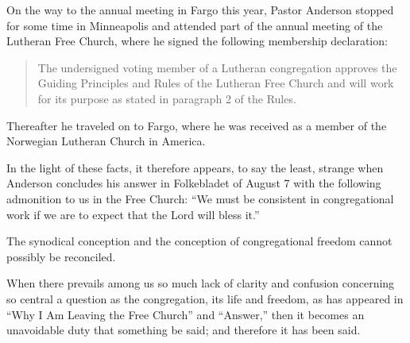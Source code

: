 On the way to the annual meeting in Fargo this year, Pastor Anderson stopped for some time in Minneapolis and attended part of the annual meeting of the Lutheran Free Church, where he signed the following membership declaration:

\begin{quote}
The undersigned voting member of a Lutheran congregation approves the Guiding Principles and Rules of the Lutheran Free Church and will work for its purpose as stated in paragraph 2 of the Rules.
\end{quote}

Thereafter he traveled on to Fargo, where he was received as a member of the Norwegian Lutheran Church in America.

In the light of these facts, it therefore appears, to say the least, strange when Anderson concludes his answer in Folkebladet of August 7 with the following admonition to us in the Free Church: “We must be consistent in congregational work if we are to expect that the Lord will bless it.”

The synodical conception and the conception of congregational freedom cannot possibly be reconciled.

When there prevails among us so much lack of clarity and confusion concerning so central a question as the congregation, its life and freedom, as has appeared in “Why I Am Leaving the Free Church” and “Answer,” then it becomes an unavoidable duty that something be said; and therefore it has been said.
